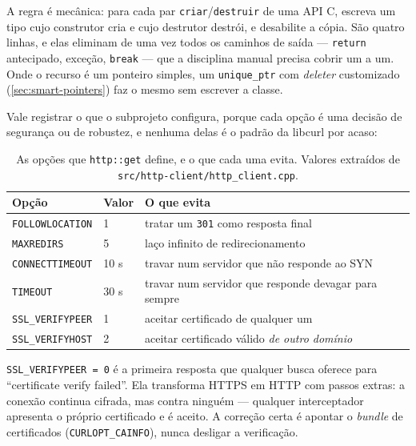 \begin{regra}
A regra é mecânica: para cada par \texttt{criar}/\texttt{destruir} de uma API C,
escreva um tipo cujo construtor cria e cujo destrutor destrói, e desabilite a
cópia. São quatro linhas, e elas eliminam de uma vez todos os caminhos de saída
--- \texttt{return} antecipado, exceção, \texttt{break} --- que a disciplina
manual precisa cobrir um a um. Onde o recurso é um ponteiro simples, um
\texttt{unique\_ptr} com \emph{deleter} customizado (\cref{sec:smart-pointers})
faz o mesmo sem escrever a classe.
\end{regra}

Vale registrar o que o subprojeto configura, porque cada opção é uma decisão de
segurança ou de robustez, e nenhuma delas é o padrão da libcurl por acaso:

\begin{table}[htbp]
\centering
\caption{As opções que \texttt{http::get} define, e o que cada uma evita.
         Valores extraídos de \texttt{src/http-client/http\_client.cpp}.}
\label{tab:curl-opts}
\footnotesize
\begin{tabular}{@{}llp{}@{}}
\toprule
\textbf{Opção} & \textbf{Valor} & \textbf{O que evita} \\
\midrule
\texttt{FOLLOWLOCATION}  & 1  & tratar um \texttt{301} como resposta final \\
\texttt{MAXREDIRS}       & 5  & laço infinito de redirecionamento \\
\texttt{CONNECTTIMEOUT}  & 10 s & travar num servidor que não responde ao SYN \\
\texttt{TIMEOUT}         & 30 s & travar num servidor que responde devagar para sempre \\
\texttt{SSL\_VERIFYPEER} & 1  & aceitar certificado de qualquer um \\
\texttt{SSL\_VERIFYHOST} & 2  & aceitar certificado válido \emph{de outro domínio} \\
\bottomrule
\end{tabular}
\end{table}

\begin{armadilha}
\texttt{SSL\_VERIFYPEER = 0} é a primeira resposta que qualquer busca oferece
para ``certificate verify failed''. Ela transforma HTTPS em HTTP com passos
extras: a conexão continua cifrada, mas contra ninguém --- qualquer
interceptador apresenta o próprio certificado e é aceito. A correção certa é
apontar o \emph{bundle} de certificados (\texttt{CURLOPT\_CAINFO}), nunca
desligar a verificação.
\end{armadilha}

